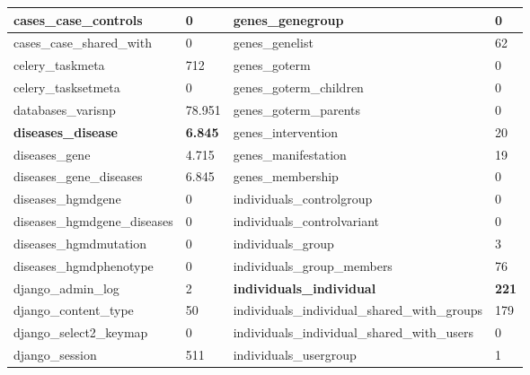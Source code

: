 {\begin{table}[p]
\begin{center}
{\begin{tabular}{|p{6cm}|p{2cm}|p{10cm}|p{3cm}|}
cases\_case\_controls         & 0                  & genes\_genegroup                              & 0                  \\ \hline
cases\_case\_shared\_with     & 0                  & genes\_genelist                               & 62                 \\ \hline
celery\_taskmeta              & 712                & genes\_goterm                                 & 0                  \\ \hline
celery\_tasksetmeta           & 0                  & genes\_goterm\_children                       & 0                  \\ \hline
databases\_varisnp            & 78.951 & genes\_goterm\_parents                        & 0                  \\ \hline
\textbf{diseases\_disease}    & \textbf{6.845}     & genes\_intervention                           & 20                 \\ \hline
diseases\_gene                & 4.715              & genes\_manifestation                          & 19                 \\ \hline
diseases\_gene\_diseases      & 6.845              & genes\_membership                             & 0                  \\ \hline
diseases\_hgmdgene            & 0                  & individuals\_controlgroup                     & 0                  \\ \hline
diseases\_hgmdgene\_diseases  & 0                  & individuals\_controlvariant                   & 0                  \\ \hline
diseases\_hgmdmutation        & 0                  & individuals\_group                            & 3                  \\ \hline
diseases\_hgmdphenotype       & 0                  & individuals\_group\_members                   & 76                 \\ \hline
django\_admin\_log            & 2                  & \textbf{individuals\_individual}              & \textbf{221}       \\ \hline
django\_content\_type         & 50                 & individuals\_individual\_shared\_with\_groups & 179                \\ \hline
django\_select2\_keymap       & 0                  & individuals\_individual\_shared\_with\_users  & 0                  \\ \hline
django\_session               & 511                & individuals\_usergroup                        & 1                  \\ \hline

\end{tabular}}
\end{center}
\end{table}}
